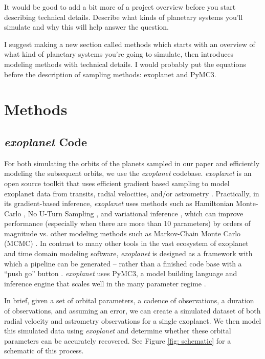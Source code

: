 \documentclass[twocolumn]{aastex631}
\newcommand{\racomment}[1]{{\color{blue}#1}}
\begin{document}
\racomment{It would be good to add a bit more of a project overview before you start describing technical details.
Describe what kinds of planetary systems you'll simulate and why this will help answer the question.}

\racomment{I suggest making a new section called methods which starts with an overview of what kind of planetary systems you're going to simulate, then introduces modeling methods with technical details. I would probably put the equations before the description of sampling methods: exoplanet and PyMC3.}

\clearpage

\section{Methods}
\subsection{\textit{exoplanet} Code}
For both simulating the orbits of the planets sampled in our paper and efficiently modeling the subsequent orbits, we use the \textit{exoplanet} codebase. \textit{exoplanet} is an open source toolkit that uses efficient gradient based sampling to model exoplanet data from transits, radial velocities, and/or astrometry \citep{Foreman-Mackey2021}. Practically, in its gradient-based inference, \textit{exoplanet} uses methods such as Hamiltonian Monte-Carlo \citep{}, No U-Turn Sampling \citep{}, and variational inference \citep{}, which can improve performance (especially when there are more than 10 parameters) by orders of magnitude vs. other modeling methods such as Markov-Chain Monte Carlo (MCMC) \citep{Foreman-Mackey2021}. In contrast to many other tools in the vast ecosystem of exoplanet and time domain modeling software, \textit{exoplanet} is designed as a framework with which a pipeline can be generated -- rather than a finished code base with a ``push go'' button \citep{Foreman-Mackey2021}. \textit{exoplanet} uses PyMC3, a model building language and inference engine that scales well in the many parameter regime \citep{Salvatier2016}. 



In brief, given a set of orbital parameters, a cadence of observations, a duration of observations, and assuming an error, we can create a simulated dataset of both radial velocity and astrometry observations for a single exoplanet. We then model this simulated data using \textit{exoplanet} and determine whether these orbital parameters can be accurately recovered. See Figure \ref{fig: schematic} for a schematic of this process.
\end{document}
